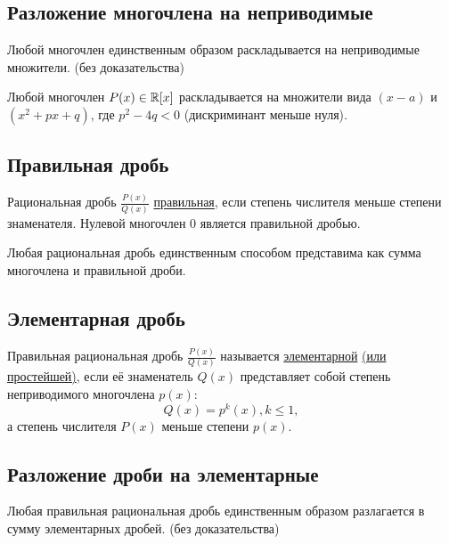 	\subsection{Разложение многочлена на неприводимые}
	
	\begin{theorem}
		Любой многочлен единственным образом раскладывается на неприводимые множители. (без доказательства)
	\end{theorem}
	
	\begin{mention}
		Любой многочлен $P(x) \in \mathbb R[x]$ раскладывается на множители вида $(x - a)$ и $(x^2 + px + q)$, где $p^2 - 4q < 0$ (дискриминант меньше нуля).	
	\end{mention}
	
	\subsection{Правильная дробь}
	
	\begin{definition}
		Рациональная дробь $\frac{P(x)}{Q(x)}$
		\underline{правильная}, если степень числителя
		меньше степени знаменателя. Нулевой многочлен 0 является правильной дробью.
	\end{definition}
	
	\begin{mention}
		Любая рациональная дробь единственным способом
		представима как сумма многочлена и правильной дроби.
	\end{mention}
	
	\subsection{Элементарная дробь}
	
	\begin{definition}
		Правильная рациональная дробь $\frac{P(x)}{Q(x)}$ называется \underline{элементарной} \underline{(или простейшей)}, если её знаменатель $Q(x)$ представляет собой степень неприводимого многочлена $p(x)$:
		\[ Q(x) = p^k(x), k \leqslant 1, \]
		а степень числителя $P(x)$ меньше степени $p(x)$.
	\end{definition}
	
	\subsection{Разложение дроби на элементарные}
	
	\begin{theorem}
		Любая правильная рациональная дробь единственным образом разлагается в сумму элементарных дробей. (без доказательства)
	\end{theorem}
	

